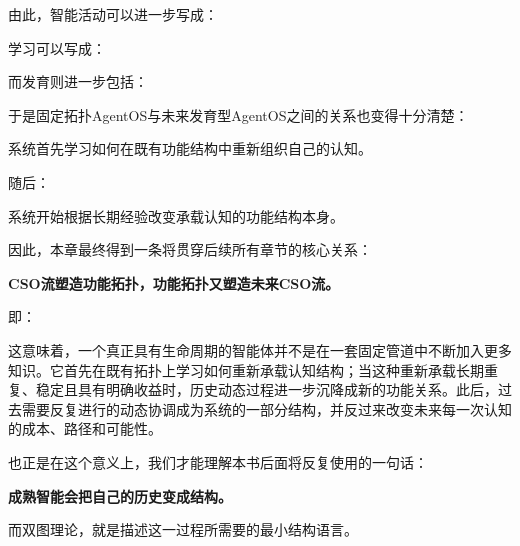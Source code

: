 由此，智能活动可以进一步写成：
\begin{statementbox}
\centering
{}
\end{statementbox}

学习可以写成：
\begin{statementbox}
\centering
{}
\end{statementbox}

而发育则进一步包括：
\begin{statementbox}
\centering
{}
\end{statementbox}

于是固定拓扑AgentOS与未来发育型AgentOS之间的关系也变得十分清楚：

\begin{statementbox}
\centering
{}
\end{statementbox}

系统首先学习如何在既有功能结构中重新组织自己的认知。

随后：

\begin{statementbox}
\centering
{}
\end{statementbox}

系统开始根据长期经验改变承载认知的功能结构本身。

因此，本章最终得到一条将贯穿后续所有章节的核心关系：

\begin{conclusion}
\bfseries
CSO流塑造功能拓扑，功能拓扑又塑造未来CSO流。
\end{conclusion}

即：
\begin{statementbox}
\centering
{}
\end{statementbox}

这意味着，一个真正具有生命周期的智能体并不是在一套固定管道中不断加入更多知识。它首先在既有拓扑上学习如何重新承载认知结构；当这种重新承载长期重复、稳定且具有明确收益时，历史动态过程进一步沉降成新的功能关系。此后，过去需要反复进行的动态协调成为系统的一部分结构，并反过来改变未来每一次认知的成本、路径和可能性。

也正是在这个意义上，我们才能理解本书后面将反复使用的一句话：

\begin{conclusion}
\bfseries
成熟智能会把自己的历史变成结构。
\end{conclusion}

而双图理论，就是描述这一过程所需要的最小结构语言。
